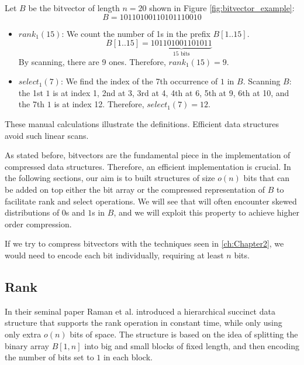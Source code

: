 \begin{example}
    Let $B$ be the bitvector of length $n=20$ shown in Figure \ref{fig:bitvector_example}:
    \[ B = 10110100110101110010 \]

    \begin{itemize}
        \item $rank_1(15)$: We count the number of 1s in the prefix $B[1..15]$.
              \[ B[1..15] = \underbrace{101101001101011}_{15 \text{ bits}} \]
              By scanning, there are 9 ones. Therefore, $rank_1(15) = 9$.

        \item $select_1(7)$: We find the index of the 7th occurrence of $1$ in $B$.
              Scanning $B$: the 1st $1$ is at index 1, 2nd at 3, 3rd at 4, 4th at 6, 5th at 9, 6th at 10, and the 7th $1$ is at index 12.
              Therefore, $select_1(7) = 12$.
    \end{itemize}
    These manual calculations illustrate the definitions. Efficient data structures avoid such linear scans.
\end{example}






As stated before, bitvectors are the fundamental piece in the implementation of compressed data structures. Therefore, an efficient implementation is crucial. In the following sections, our aim is to built structures of size $o(n)$ bits that can be added on top either the bit array or the compressed representation of $B$ to facilitate rank and select operations. We will see that will often encounter skewed distributions of $0$s and $1$s in $B$, and we will exploit this property to achieve higher order compression.

\begin{remark}
    If we try to compress bitvectors with the techniques seen in \autoref{ch:Chapter2}, we would need to encode each bit individually, requiring at least $n$ bits.
\end{remark}

\subsection{Rank} \label{subsec:rank}

In their seminal paper \cite{RRR2002} Raman et al. introduced a hierarchical succinct data structure that supports the rank operation in constant time, while only using only extra $o(n)$  bits of space. The structure is based on the idea of splitting the binary array $B[1, n]$ into big and small blocks of fixed length, and then encoding the number of bits set to $1$ in each block.

